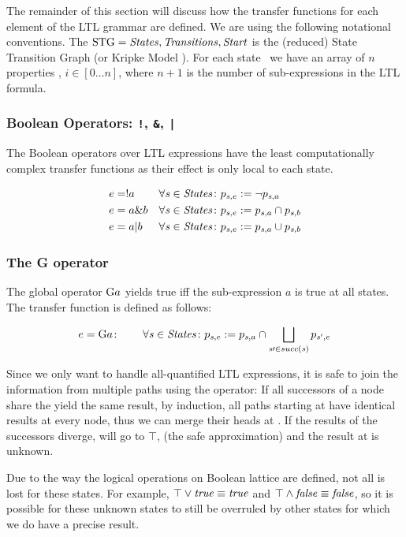 The remainder of this section will discuss how the transfer functions
for each element of the LTL grammar are defined. We are using the
following notational conventions. The
$\mathrm{STG}={\mathit{States},\mathit{Transitions},\mathit{Start}}$ is the
(reduced) State Transition Graph (or Kripke Model
\citep[pg. 27ff]{Clarke1999}). For each state \state\ we have an array of $n$
properties , $i \in [0\dots n]$, where $n+1$ is the number of
sub-expressions in the LTL formula.

\subsubsection{Boolean Operators: \texttt{!}, \texttt{\&}, \texttt{|}}
The Boolean operators over LTL expressions have the least
computationally complex transfer functions as their effect is only
local to each state.

\begin{align*}
e &= !a  & \forall\mathit{s}\in\mathit{States}\colon p_{\mathit{s},e} &:= \neg p_{\mathit{s},a}\\
e &= a \& b & \forall\mathit{s}\in\mathit{States}\colon p_{\mathit{s},e} &:= p_{\mathit{s},a} \cap p_{\mathit{s},b}\\
e &= a | b & \forall\mathit{s}\in\mathit{States}\colon p_{\mathit{s},e} &:= p_{\mathit{s},a} \cup p_{\mathit{s},b}\\
\end{align*}

\subsubsection{The G operator}
The global operator $\mathrm{G} a$ yields true iff the sub-expression $a$ is
true at all states. The transfer function is defined as follows:

\[ e = \mathrm{G} a\colon\qquad\forall\mathit{s}\in\mathit{States}\colon p_{\mathit{s},e}
:=p_{\mathit{s},a}\cap\bigsqcup_{\mathit{s}\prime\in succ(\mathit{s})}{p_{\mathit{s}',e}} \]

Since we only want to handle all-quantified LTL expressions, it is
safe to join the information from multiple paths using the \lub
operator: If all successors of a node share the yield the same result,
by induction, all paths starting at \state have identical results at
every node, thus we can merge their heads at \state. If the results of
the successors diverge, \state will go to $\top$, (the safe
approximation) and the result at \state is unknown.

Due to the way the logical operations on Boolean lattice are defined,
not all is lost for these states. For example, $\top \vee \mathit{true}
\equiv \mathit{true}$ and $\top \wedge \mathit{false} \equiv \mathit{false}$, so it is
possible for these unknown states to still be overruled by other
states for which we do have a precise result.

